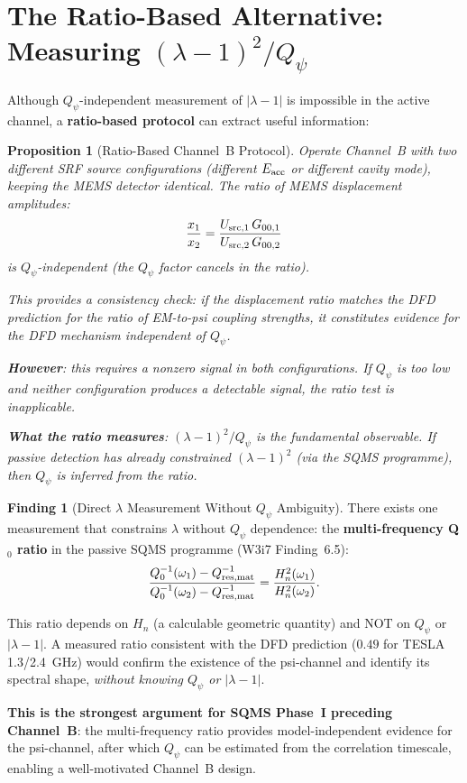 \documentclass[11pt]{article}
\newcommand{\lam}{\lambda}
\newcommand{\Qpsi}{Q_\psi}
\newcommand{\Heff}{H_n}
\newcommand{\lbone}{|\lam - 1|}
\newtheorem{proposition}[theorem]{Proposition}
\theoremstyle{definition}
\newtheorem{finding}[theorem]{Finding}
\theoremstyle{remark}
\begin{document}
\section{The Ratio-Based Alternative: Measuring $(\lam-1)^2/\Qpsi$}
\label{sec:ratio_based}

Although $\Qpsi$-independent measurement of $\lbone$ is impossible
in the active channel, a \textbf{ratio-based protocol} can extract
useful information:

\begin{proposition}[Ratio-Based Channel~B Protocol]
\label{prop:ratio_based}
Operate Channel~B with two different SRF source configurations
(different $E_{\rm acc}$ or different cavity mode), keeping the MEMS
detector identical. The ratio of MEMS displacement amplitudes:
\begin{equation}
\frac{x_1}{x_2} = \frac{U_{\rm src,1}\,G_{00,1}}
{U_{\rm src,2}\,G_{00,2}}
\end{equation}
is $\Qpsi$-independent (the $\Qpsi$ factor cancels in the ratio).

This provides a consistency check: if the displacement ratio matches
the DFD prediction for the ratio of EM-to-psi coupling strengths,
it constitutes evidence for the DFD mechanism independent of $\Qpsi$.

\textbf{However}: this requires a \emph{nonzero} signal in both
configurations. If $\Qpsi$ is too low and neither configuration
produces a detectable signal, the ratio test is inapplicable.

\textbf{What the ratio measures}: $(\lam-1)^2/\Qpsi$ is the
fundamental observable. If passive detection has already constrained
$(\lam-1)^2$ (via the SQMS programme), then $\Qpsi$ is inferred
from the ratio.
\end{proposition}

\begin{finding}[Direct $\lambda$ Measurement Without $\Qpsi$ Ambiguity]
\label{find:direct_lambda}
There exists one measurement that constrains $\lambda$ without
$\Qpsi$ dependence: the \textbf{multi-frequency Q$_0$ ratio}
in the passive SQMS programme (W3i7 Finding~6.5):
\begin{equation}
\frac{Q_0^{-1}(\omega_1) - Q_{\rm res,mat}^{-1}}
{Q_0^{-1}(\omega_2) - Q_{\rm res,mat}^{-1}}
= \frac{\Heff^2(\omega_1)}{\Heff^2(\omega_2)}.
\end{equation}

This ratio depends on $\Heff$ (a calculable geometric quantity)
and NOT on $\Qpsi$ or $\lbone$. A measured ratio consistent with the
DFD prediction ($0.49$ for TESLA 1.3/2.4~GHz) would confirm the
existence of the psi-channel and identify its spectral shape,
\emph{without knowing $\Qpsi$ or $\lbone$}.

\textbf{This is the strongest argument for SQMS Phase~I preceding
Channel~B}: the multi-frequency ratio provides model-independent
evidence for the psi-channel, after which $\Qpsi$ can be estimated
from the correlation timescale, enabling a well-motivated Channel~B
design.
\end{finding}
\end{document}
